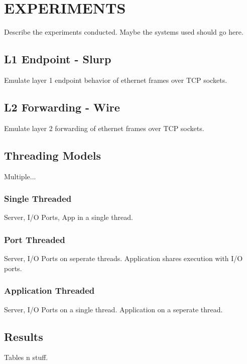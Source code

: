 \chapter{EXPERIMENTS}
\label{expr}
Describe the experiments conducted. Maybe the systems used should go here.

\section{L1 Endpoint - Slurp}
\label{expr:slurp}
Emulate layer 1 endpoint behavior of ethernet frames over TCP sockets.

\section{L2 Forwarding - Wire}
\label{expr:wire}
Emulate layer 2 forwarding of ethernet frames over TCP sockets.

\section{Threading Models}
\label{expr:models}
Multiple...

\subsection{Single Threaded}
\label{expr:models-single}
Server, I/O Ports, App in a single thread.

\subsection{Port Threaded}
\label{expr:models-port}
Server, I/O Ports on seperate threads. Application shares execution
with I/O ports.

\subsection{Application Threaded}
\label{expr:models-app}
Server, I/O Ports on a single thread. Application on a seperate thread.

\section{Results}
\label{expr:results}
Tables n stuff.
